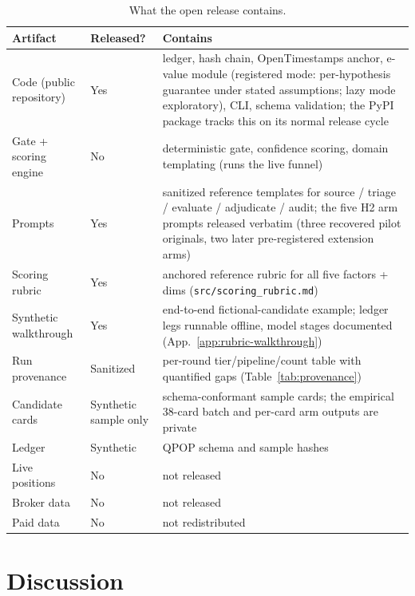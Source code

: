 \documentclass[11pt]{article}
\begin{document}
\begin{table}[H]
\centering
\small
\begin{tabularx}{\linewidth}{@{}llL@{}}
\toprule
\textbf{Artifact} & \textbf{Released?} & \textbf{Contains} \\
\midrule
Code (public repository) & Yes & ledger, hash chain, OpenTimestamps anchor, e-value module (registered mode: per-hypothesis guarantee under stated assumptions; lazy mode exploratory), CLI, schema validation; the PyPI package tracks this on its normal release cycle \\
Gate + scoring engine & No                   & deterministic gate, confidence scoring, domain templating (runs the live funnel) \\
Prompts         & Yes                        & sanitized reference templates for source / triage / evaluate / adjudicate / audit; the five H2 arm prompts released verbatim (three recovered pilot originals, two later pre-registered extension arms) \\
Scoring rubric  & Yes                        & anchored reference rubric for all five factors + dims (\texttt{src/scoring\_rubric.md}) \\
Synthetic walkthrough & Yes                  & end-to-end fictional-candidate example; ledger legs runnable offline, model stages documented (App.~\ref{app:rubric-walkthrough}) \\
Run provenance  & Sanitized                  & per-round tier/pipeline/count table with quantified gaps (Table~\ref{tab:provenance}) \\
Candidate cards & Synthetic sample only      & schema-conformant sample cards; the empirical 38-card batch and per-card arm outputs are private \\
Ledger          & Synthetic                  & QPOP schema and sample hashes \\
Live positions  & No                         & not released \\
Broker data     & No                         & not released \\
Paid data       & No                         & not redistributed \\
\bottomrule
\end{tabularx}
\caption{What the open release contains.}
\label{tab:release}
\end{table}

\section{Discussion}
\end{document}

